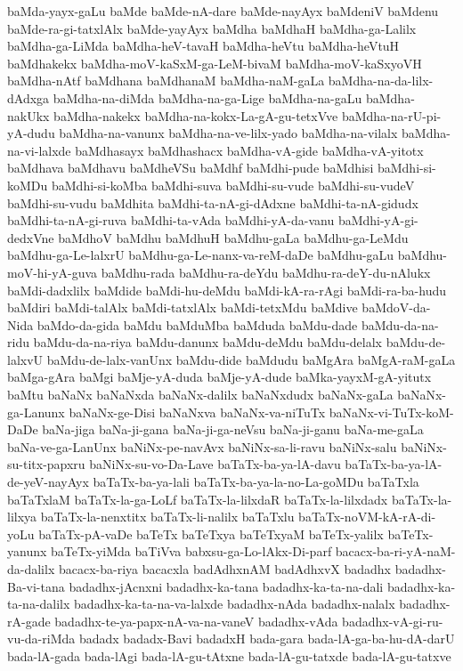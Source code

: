 {baMda-yayx-gaLu
baMde
baMde-nA-dare
baMde-nayAyx
baMdeniV
baMdenu
baMde-ra-gi-tatxlAlx
baMde-yayAyx
baMdha
baMdhaH
baMdha-ga-Lalilx
baMdha-ga-LiMda
baMdha-heV-tavaH
baMdha-heVtu
baMdha-heVtuH
baMdhakekx
baMdha-moV-kaSxM-ga-LeM-bivaM
baMdha-moV-kaSxyoVH
baMdha-nAtf
baMdhana
baMdhanaM
baMdha-naM-gaLa
baMdha-na-da-lilx-dAdxga
baMdha-na-diMda
baMdha-na-ga-Lige
baMdha-na-gaLu
baMdha-nakUkx
baMdha-nakekx
baMdha-na-kokx-La-gA-gu-tetxVve
baMdha-na-rU-pi-yA-dudu
baMdha-na-vanunx
baMdha-na-ve-lilx-yado
baMdha-na-vilalx
baMdha-na-vi-lalxde
baMdhasayx
baMdhashacx
baMdha-vA-gide
baMdha-vA-yitotx
baMdhava
baMdhavu
baMdheVSu
baMdhf
baMdhi-pude
baMdhisi
baMdhi-si-koMDu
baMdhi-si-koMba
baMdhi-suva
baMdhi-su-vude
baMdhi-su-vudeV
baMdhi-su-vudu
baMdhita
baMdhi-ta-nA-gi-dAdxne
baMdhi-ta-nA-gidudx
baMdhi-ta-nA-gi-ruva
baMdhi-ta-vAda
baMdhi-yA-da-vanu
baMdhi-yA-gi-dedxVne
baMdhoV
baMdhu
baMdhuH
baMdhu-gaLa
baMdhu-ga-LeMdu
baMdhu-ga-Le-lalxrU
baMdhu-ga-Le-nanx-va-reM-daDe
baMdhu-gaLu
baMdhu-moV-hi-yA-guva
baMdhu-rada
baMdhu-ra-deYdu
baMdhu-ra-deY-du-nAlukx
baMdi-dadxlilx
baMdide
baMdi-hu-deMdu
baMdi-kA-ra-rAgi
baMdi-ra-ba-hudu
baMdiri
baMdi-talAlx
baMdi-tatxlAlx
baMdi-tetxMdu
baMdive
baMdoV-da-Nida
baMdo-da-gida
baMdu
baMduMba
baMduda
baMdu-dade
baMdu-da-na-ridu
baMdu-da-na-riya
baMdu-danunx
baMdu-deMdu
baMdu-delalx
baMdu-de-lalxvU
baMdu-de-lalx-vanUnx
baMdu-dide
baMdudu
baMgAra
baMgA-raM-gaLa
baMga-gAra
baMgi
baMje-yA-duda
baMje-yA-dude
baMka-yayxM-gA-yitutx
baMtu
baNaNx
baNaNxda
baNaNx-dalilx
baNaNxdudx
baNaNx-gaLa
baNaNx-ga-Lanunx
baNaNx-ge-Disi
baNaNxva
baNaNx-va-niTuTx
baNaNx-vi-TuTx-koM-DaDe
baNa-jiga
baNa-ji-gana
baNa-ji-ga-neVsu
baNa-ji-ganu
baNa-me-gaLa
baNa-ve-ga-LanUnx
baNiNx-pe-navAvx
baNiNx-sa-li-ravu
baNiNx-salu
baNiNx-su-titx-papxru
baNiNx-su-vo-Da-Lave
baTaTx-ba-ya-lA-davu
baTaTx-ba-ya-lA-de-yeV-nayAyx
baTaTx-ba-ya-lali
baTaTx-ba-ya-la-no-La-goMDu
baTaTxla
baTaTxlaM
baTaTx-la-ga-LoLf
baTaTx-la-lilxdaR
baTaTx-la-lilxdadx
baTaTx-la-lilxya
baTaTx-la-nenxtitx
baTaTx-li-nalilx
baTaTxlu
baTaTx-noVM-kA-rA-di-yoLu
baTaTx-pA-vaDe
baTeTx
baTeTxya
baTeTxyaM
baTeTx-yalilx
baTeTx-yanunx
baTeTx-yiMda
baTiVva
babxsu-ga-Lo-lAkx-Di-parf
bacacx-ba-ri-yA-naM-da-dalilx
bacacx-ba-riya
bacacxla
badAdhxnAM
badAdhxvX
badadhx
badadhx-Ba-vi-tana
badadhx-jAcnxni
badadhx-ka-tana
badadhx-ka-ta-na-dali
badadhx-ka-ta-na-dalilx
badadhx-ka-ta-na-va-lalxde
badadhx-nAda
badadhx-nalalx
badadhx-rA-gade
badadhx-te-ya-papx-nA-va-na-vaneV
badadhx-vAda
badadhx-vA-gi-ru-vu-da-riMda
badadx
badadx-Bavi
badadxH
bada-gara
bada-lA-ga-ba-hu-dA-darU
bada-lA-gada
bada-lAgi
bada-lA-gu-tAtxne
bada-lA-gu-tatxde
bada-lA-gu-tatxve
}
